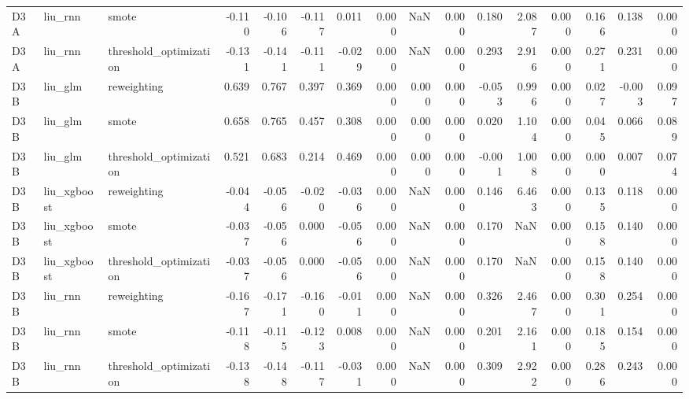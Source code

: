 \begin{tabular}{lllrrrrrrrrrrrrr}
D3A & liu_rnn & smote & -0.110 & -0.106 & -0.117 & 0.011 & 0.000 & NaN & 0.000 & 0.180 & 2.087 & 0.000 & 0.166 & 0.138 & 0.000 \\
D3A & liu_rnn & threshold_optimization & -0.131 & -0.141 & -0.111 & -0.029 & 0.000 & NaN & 0.000 & 0.293 & 2.916 & 0.000 & 0.271 & 0.231 & 0.000 \\
D3B & liu_glm & reweighting & 0.639 & 0.767 & 0.397 & 0.369 & 0.000 & 0.000 & 0.000 & -0.053 & 0.996 & 0.000 & 0.027 & -0.003 & 0.097 \\
D3B & liu_glm & smote & 0.658 & 0.765 & 0.457 & 0.308 & 0.000 & 0.000 & 0.000 & 0.020 & 1.104 & 0.000 & 0.045 & 0.066 & 0.089 \\
D3B & liu_glm & threshold_optimization & 0.521 & 0.683 & 0.214 & 0.469 & 0.000 & 0.000 & 0.000 & -0.001 & 1.008 & 0.000 & 0.000 & 0.007 & 0.074 \\
D3B & liu_xgboost & reweighting & -0.044 & -0.056 & -0.020 & -0.036 & 0.000 & NaN & 0.000 & 0.146 & 6.463 & 0.000 & 0.135 & 0.118 & 0.000 \\
D3B & liu_xgboost & smote & -0.037 & -0.056 & 0.000 & -0.056 & 0.000 & NaN & 0.000 & 0.170 & NaN & 0.000 & 0.158 & 0.140 & 0.000 \\
D3B & liu_xgboost & threshold_optimization & -0.037 & -0.056 & 0.000 & -0.056 & 0.000 & NaN & 0.000 & 0.170 & NaN & 0.000 & 0.158 & 0.140 & 0.000 \\
D3B & liu_rnn & reweighting & -0.167 & -0.171 & -0.160 & -0.011 & 0.000 & NaN & 0.000 & 0.326 & 2.467 & 0.000 & 0.301 & 0.254 & 0.000 \\
D3B & liu_rnn & smote & -0.118 & -0.115 & -0.123 & 0.008 & 0.000 & NaN & 0.000 & 0.201 & 2.161 & 0.000 & 0.185 & 0.154 & 0.000 \\
D3B & liu_rnn & threshold_optimization & -0.138 & -0.148 & -0.117 & -0.031 & 0.000 & NaN & 0.000 & 0.309 & 2.922 & 0.000 & 0.286 & 0.243 & 0.000 \\
\bottomrule
\end{tabular}
